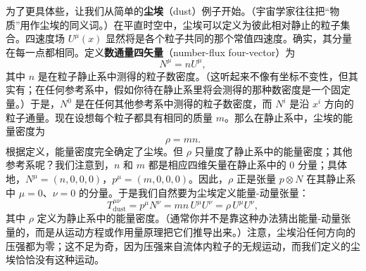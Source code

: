 为了更具体些，让我们从简单的\textbf{尘埃}（dust）例子开始。（宇宙学家往往把“物质”用作尘埃的同义词。）在平直时空中，尘埃可以定义为彼此相对静止的粒子集合。四速度场 $U^{\mu}(x)$ 显然将是各个粒子共同的那个常值四速度。确实，其分量在每一点都相同。定义\textbf{数通量四矢量}（number-flux four-vector）为
\begin{equation*}
N^{\mu} = nU^{\mu},
\tag{1.108}
\end{equation*}
其中 $n$ 是在粒子静止系中测得的粒子数密度。（这听起来不像有坐标不变性，但其实有；在任何参考系中，假如你待在静止系里将会测得的那种数密度是一个固定量。）于是，$N^{0}$ 是在任何其他参考系中测得的粒子数密度，而 $N^{i}$ 是沿 $x^{i}$ 方向的粒子通量。现在设想每个粒子都具有相同的质量 $m$。那么在静止系中，尘埃的能量密度为
\begin{equation*}
\rho = mn.
\tag{1.109}
\end{equation*}
根据定义，能量密度完全确定了尘埃。但 $\rho$ 只量度了静止系中的能量密度；其他参考系呢？我们注意到，$n$ 和 $m$ 都是相应四维矢量在静止系中的 $0$ 分量；具体地，$N^{\mu}=(n,0,0,0)$，$p^{\mu}=(m,0,0,0)$。因此，$\rho$ 正是张量 $p\otimes N$ 在其静止系中 $\mu=0$、$\nu=0$ 的分量。于是我们自然要为尘埃定义能量-动量张量：
\begin{equation*}
T^{\mu\nu}_{\mathrm{dust}} = p^{\mu}N^{\nu} = mn\,U^{\mu}U^{\nu} = \rho\,U^{\mu}U^{\nu},
\tag{1.110}
\end{equation*}
其中 $\rho$ 定义为静止系中的能量密度。（通常你并不是靠这种办法猜出能量-动量张量的，而是从运动方程或作用量原理把它们推导出来。）注意，尘埃沿任何方向的压强都为零；这不足为奇，因为压强来自流体内粒子的无规运动，而我们定义的尘埃恰恰没有这种运动。

